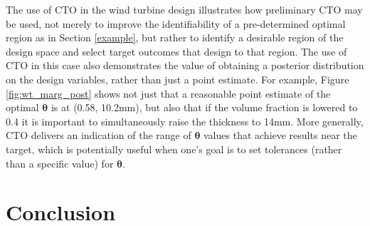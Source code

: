 \documentclass[12pt]{article}
\begin{document}
The use of CTO in the wind turbine design illustrates how preliminary CTO may be used, not merely to improve the identifiability of a pre-determined optimal region as in Section \ref{example}, but rather to identify a desirable region of the design space and select target outcomes that design to that region.
%
%
%
%
%
The use of CTO in this case also demonstrates the value of obtaining a posterior distribution on the design variables, rather than just a point estimate.
%
For example, Figure \ref{fig:wt_marg_post} shows not just that a reasonable point estimate of the optimal $\boldsymbol\theta$ is at (0.58, 10.2mm), but also that if the volume fraction is lowered to 0.4 it is important to simultaneously raise the thickness to 14mm.
%
More generally, CTO delivers an indication of the range of $\boldsymbol\theta$ values that achieve results near the target, which is potentially useful when one's goal is to set tolerances (rather than a specific value) for $\boldsymbol\theta$.
%
%



\section{Conclusion} \label{conclusion}
\end{document}
